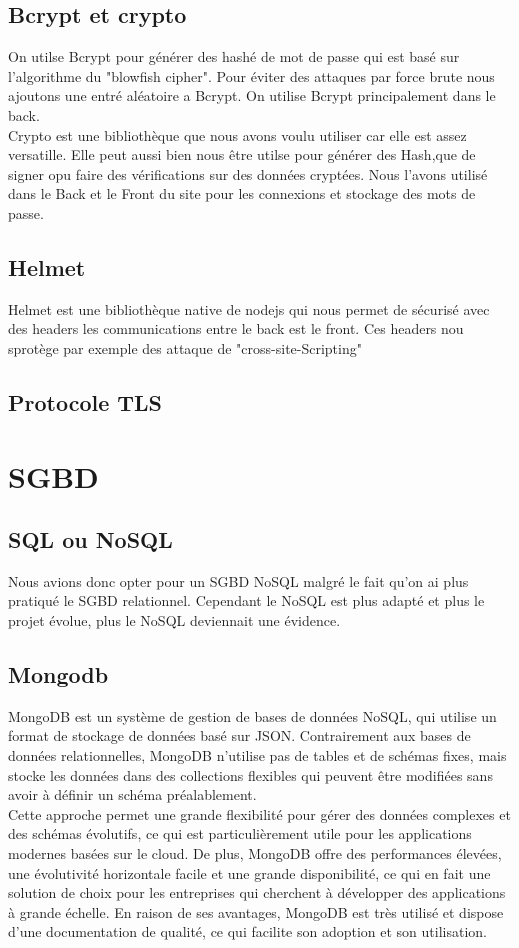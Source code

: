 \documentclass[a4paper,12pt]{report}
\begin{document}
\subsection{Bcrypt et crypto}
 On utilse Bcrypt pour générer des hashé de mot de passe qui est basé sur l'algorithme du "blowfish cipher". Pour éviter des attaques par force brute nous ajoutons une entré aléatoire a Bcrypt. On utilise Bcrypt principalement dans le back.\\
 
 Crypto est une bibliothèque que nous avons voulu utiliser car elle est assez versatille. Elle peut aussi bien nous être utilse pour générer des Hash,que de signer opu faire des vérifications sur des données cryptées. Nous l'avons utilisé dans le Back et le Front du site pour les connexions et stockage des mots de passe.
 
\subsection{Helmet}
	Helmet est une bibliothèque native de nodejs qui nous permet de sécurisé avec des headers les communications entre le back est le front. Ces headers nou sprotège par exemple des attaque de "cross-site-Scripting"

\subsection{Protocole TLS}

\section{SGBD}
\subsection{SQL ou NoSQL}
Nous avions donc opter pour un SGBD NoSQL malgré le fait qu'on ai plus pratiqué le SGBD relationnel. Cependant le NoSQL est plus adapté et plus le projet évolue, plus le NoSQL deviennait une évidence.
\subsection{Mongodb}
MongoDB est un système de gestion de bases de données NoSQL, qui utilise un format de stockage de données basé sur JSON. Contrairement aux bases de données relationnelles, MongoDB n'utilise pas de tables et de schémas fixes, mais stocke les données dans des collections flexibles qui peuvent être modifiées sans avoir à définir un schéma préalablement.\\
Cette approche permet une grande flexibilité pour gérer des données complexes et des schémas évolutifs, ce qui est particulièrement utile pour les applications modernes basées sur le cloud. De plus, MongoDB offre des performances élevées, une évolutivité horizontale facile et une grande disponibilité, ce qui en fait une solution de choix pour les entreprises qui cherchent à développer des applications à grande échelle.
En raison de ses avantages, MongoDB est très utilisé et dispose d'une documentation de qualité, ce qui facilite son adoption et son utilisation.
\end{document}
